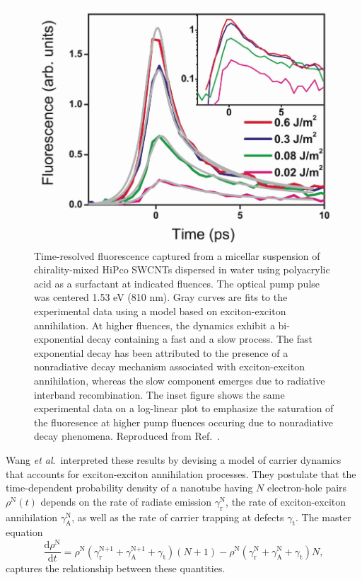 \begin{figure}[H]
	\centering
	\includegraphics[scale=0.25]{images/chapter_prior_works/fluorescence_wang_2004}
	\caption{Time-resolved fluorescence captured from a micellar suspension of chirality-mixed HiPco SWCNTs dispersed in water using polyacrylic acid as a surfactant at indicated fluences. The optical pump pulse was centered 1.53 eV (810 nm). Gray curves are fits to the experimental data using a model based on exciton-exciton annihilation. At higher fluences, the dynamics exhibit a bi-exponential decay containing a fast and a slow process. The fast exponential decay has been attributed to the presence of a nonradiative decay mechanism associated with exciton-exciton annihilation, whereas the slow component emerges due to radiative interband recombination. The inset figure shows the same experimental data on a log-linear plot to emphasize the saturation of the fluoresence at higher pump fluences occuring due to nonradiative decay phenomena. Reproduced from Ref.\ \cite{wang2004observation}.}
	\label{fig:fluorescence_wang_2004}
\end{figure}

Wang \textit{et al}.\ interpreted these results by devising a model of carrier dynamics that accounts for exciton-exciton annihilation processes. They postulate that the time-dependent probability density of a nanotube having $N$ electron-hole pairs $\rho^\text{N}(t)$ depends on the rate of radiate emission $\gamma^\text{N}_\text{r}$, the rate of exciton-exciton annihilation $\gamma^\text{N}_\text{A}$, as well as the rate of carrier trapping at defects $\gamma_\text{t}$. The master equation
\begin{equation}
	\dfrac{\mathrm{d}\rho^\text{N}}{\mathrm{d} t} = \rho^\text{N}(\gamma^\text{N+1}_\text{r} + \gamma^\text{N+1}_\text{A} + \gamma_\text{t})(N+1) - \rho^\text{N}(\gamma^\text{N}_\text{r} + \gamma^\text{N}_\text{A} + \gamma_\text{t})N,
\end{equation}
captures the relationship between these quantities.

